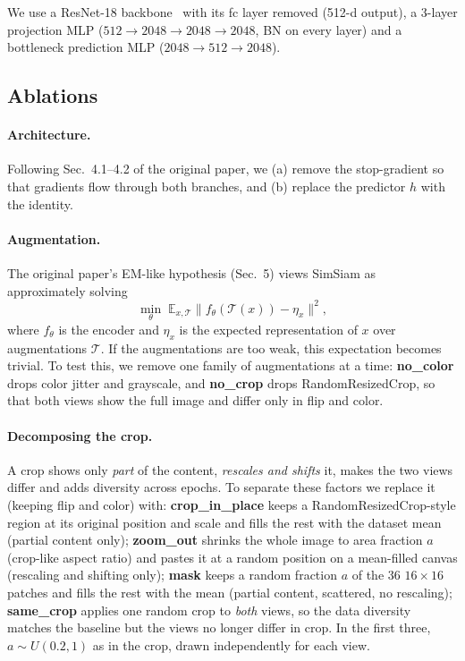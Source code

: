 \documentclass[10pt,twocolumn,letterpaper]{article}
\begin{document}
We use a ResNet-18 backbone~\cite{he2016resnet} with its fc layer removed (512-d output), a 3-layer projection MLP ($512\!\to\!2048\!\to\!2048\!\to\!2048$, BN on every layer) and a bottleneck prediction MLP ($2048\!\to\!512\!\to\!2048$).

\subsection{Ablations}
\paragraph{Architecture.}
Following Sec.~4.1--4.2 of the original paper, we (a) remove the stop-gradient so that gradients flow through both branches, and (b) replace the predictor $h$ with the identity.

\paragraph{Augmentation.}
The original paper's EM-like hypothesis (Sec.~5) views SimSiam as approximately solving
\begin{equation}
\min_\theta\; \mathbb{E}_{x,\mathcal{T}}\bigl\|f_\theta(\mathcal{T}(x))-\eta_x\bigr\|^2,
\label{eq:em}
\end{equation}
where $f_\theta$ is the encoder and $\eta_x$ is the expected representation of $x$ over augmentations $\mathcal{T}$.
If the augmentations are too weak, this expectation becomes trivial.
To test this, we remove one family of augmentations at a time:
\textbf{no\_color} drops color jitter and grayscale, and \textbf{no\_crop} drops RandomResizedCrop, so that both views show the full image and differ only in flip and color.

\paragraph{Decomposing the crop.}
A crop shows only \emph{part} of the content, \emph{rescales and shifts} it, makes the two views differ and adds diversity across epochs. To separate these factors we replace it (keeping flip and color) with:
\textbf{crop\_in\_place} keeps a RandomResizedCrop-style region at its original position and scale and fills the rest with the dataset mean (partial content only);
\textbf{zoom\_out} shrinks the whole image to area fraction $a$ (crop-like aspect ratio) and pastes it at a random position on a mean-filled canvas (rescaling and shifting only);
\textbf{mask} keeps a random fraction $a$ of the 36 $16\!\times\!16$ patches and fills the rest with the mean (partial content, scattered, no rescaling);
\textbf{same\_crop} applies one random crop to \emph{both} views, so the data diversity matches the baseline but the views no longer differ in crop.
In the first three, $a\sim U(0.2,1)$ as in the crop, drawn independently for each view.
\end{document}
